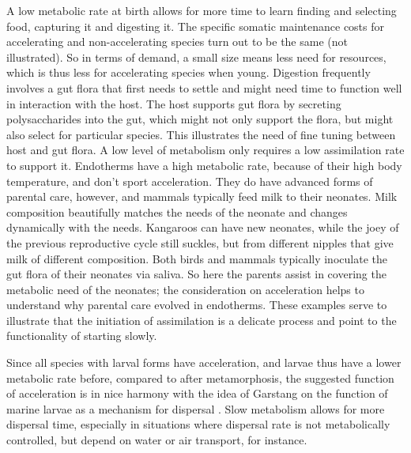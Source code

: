 A low metabolic rate at birth allows for more time to learn finding and selecting food, capturing it and digesting it.
The specific somatic maintenance costs for accelerating and non-accelerating species turn out to be the same (not illustrated).
So in terms of demand, a small size means less need for resources, which is thus less for accelerating species when young.
Digestion frequently involves a gut flora that first needs to settle and might need time to function well in interaction with the host.
The host supports gut flora by secreting polysaccharides into the gut, which might not only support the flora, but might also select for particular species.
This illustrates the need of fine tuning between host and gut flora.
A low level of metabolism only requires a low assimilation rate to support it.
Endotherms have a high metabolic rate, because of their high body temperature, and don't sport acceleration.
They do have advanced forms of parental care, however, and mammals typically feed milk to their neonates.
Milk composition beautifully matches the needs of the neonate and changes dynamically with the needs.
Kangaroos can have new neonates, while the joey of the previous reproductive cycle still suckles, but from different nipples that give milk of different composition.
Both birds and mammals typically inoculate the gut flora of their neonates via saliva.
So here the parents assist in covering the metabolic need of the neonates;
the consideration on acceleration helps to understand why parental care evolved in endotherms.
These examples serve to illustrate that the initiation of assimilation is a delicate process and point to the functionality of starting slowly.

Since all species with larval forms have acceleration, and larvae thus have a lower metabolic rate before, compared to after metamorphosis, the suggested function of acceleration is in nice harmony with the idea of Garstang on the function of marine larvae as a mechanism for dispersal \cite{Gars51}.
Slow metabolism allows for more dispersal time, especially in situations where dispersal rate is not metabolically controlled, but depend on water or air transport, for instance.

